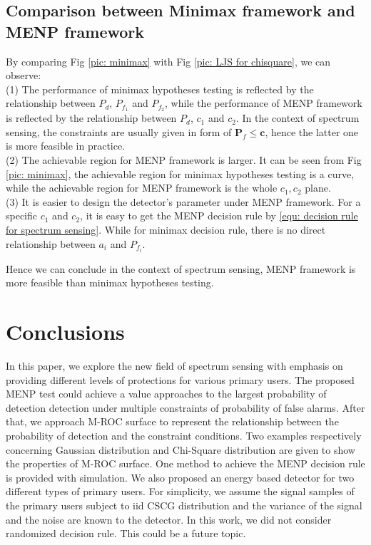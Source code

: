 \documentclass[12pt,journal,a4paper,twoside,onecolumn]{IEEEtran}
\begin{document}
\begin{spacing}{2.5}
\subsection{Comparison between Minimax framework and MENP framework}
By comparing Fig \ref{pic: minimax} with Fig \ref{pic: LJS for chisquare}, we can observe:
\\(1) The performance of minimax hypotheses testing is reflected by the relationship between $P_d$, $P_{f_1}$ and $P_{f_2}$, while the performance of MENP framework is reflected by the relationship between $P_d$, $c_1$ and $c_2$. In the context of spectrum sensing, the constraints are usually given in form of $\mathbf{P}_f \leq \mathbf{c}$, hence the latter one is more feasible in practice.  
\\(2) The achievable region for MENP framework is larger. It can be seen from Fig \ref{pic: minimax}, the achievable region for minimax hypotheses testing is a curve, while the achievable region for MENP framework is the whole $c_1, c_2$ plane.
\\(3) It is easier to design the detector's parameter under MENP framework. For a specific $c_1$ and $c_2$, it is easy to get the MENP decision rule by \eqref{equ: decision rule for spectrum sensing}. While for minimax decision rule, there is no direct relationship between $a_i$ and $P_{f_i}$.

Hence we can conclude in the context of spectrum sensing, MENP framework is more feasible than minimax hypotheses testing. 
\section{Conclusions}
In this paper, we explore the new field of spectrum sensing with emphasis on providing different levels of protections for various primary users. 
The proposed MENP test could achieve a value approaches to the largest probability of detection detection under multiple constraints of probability of false alarms. 
After that, we approach M-ROC surface to represent the relationship between the probability of detection and the constraint conditions. Two examples respectively concerning Gaussian distribution and Chi-Square distribution are given to show the properties of M-ROC surface. 
One method to achieve the MENP decision rule is provided with simulation. 
We also proposed an energy based detector for two different types of primary users.
For simplicity, we assume the signal samples of the primary users subject to iid CSCG distribution and the variance of the signal and the noise are known to the detector.
In this work, we did not consider randomized decision rule. This could be a future topic.



\end{spacing}
\end{document}
